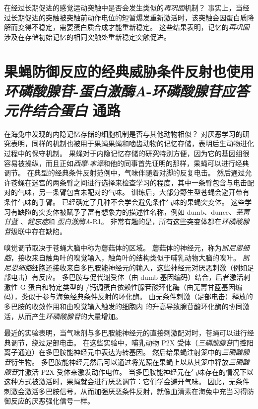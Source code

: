 在经过长期促进的感觉运动突触中是否会发生类似的\textit{再巩固}机制？
事实上，当经过长期促进的突触被突触前动作电位的短暂爆发重新激活时，该突触会因蛋白质降解而变得不稳定，需要蛋白质合成才能重新稳定。
这些结果表明，记忆的\textit{再巩固}涉及在存储初始记忆的相同突触处重新稳定突触促进。



\section{果蝇防御反应的经典威胁条件反射也使用\textit{环磷酸腺苷}-\textit{蛋白激酶A}-\textit{环磷酸腺苷应答元件结合蛋白} 通路}

在海兔中发现的内隐记忆存储的细胞机制是否与其他动物相似？
对厌恶学习的研究表明，同样的机制也被用于果蝇果蝇和啮齿动物的记忆存储，表明后生动物进化过程中的保守机制。
果蝇对于内隐记忆存储的研究特别方便，因为它的基因组很容易被操纵，而且正如\textit{西摩$\cdot$本泽}和他的同事首先证明的那样，果蝇可以进行经典调节。
在典型的经典条件反射范例中，气味伴随着对脚的反复电击。
然后通过允许苍蝇在迷宫的两条臂之间进行选择来检查学习的程度，其中一条臂包含与电击配对的气味，另一条臂包含未配对的气味。
训练后，大部分野生型苍蝇会避开带有条件气味的手臂。
已经确定了几种不会学会避免条件气味的果蝇突变体。
这些学习有缺陷的突变体被赋予了富有想象力的描述性名称，例如 dumb、dunce、\textit{芜菁甘蓝
}、\textit{健忘症}和 \textit{蛋白激酶A}-R1。
非常有趣的是，所有这些突变体都在\textit{环磷酸腺苷}级联中存在缺陷。


嗅觉调节取决于苍蝇大脑中称为蘑菇体的区域。
蘑菇体的神经元，称为\textit{凯尼恩细胞}，接收来自触角叶的嗅觉输入，触角叶的结构类似于哺乳动物大脑的嗅叶。
\textit{凯尼恩细胞}细胞还接收来自多巴胺能神经元的输入，这些神经元对厌恶刺激（例如足部电击）有反应。
多巴胺与促代谢受体（由 dumb 基因编码）结合，后者激活刺激性 G 蛋白和特定类型的 /钙调蛋白依赖性腺苷酸环化酶（由芜菁甘蓝基因编码），类似于参与海兔经典条件反射的环化酶。
由无条件刺激（足部电击）释放的多巴胺的收敛作用和由嗅觉输入触发的细胞内  的升高导致腺苷酸环化酶的协同激活，从而产生\textit{环磷酸腺苷}的大量增加。


最近的实验表明，当气味剂与多巴胺能神经元的直接刺激配对时，苍蝇可以进行经典调节，绕过足部电击。
在这些实验中，哺乳动物 P2X 受体（\textit{三磷酸腺苷}门控阳离子通道）在多巴胺能神经元中表达为转基因。
然后给果蝇注射笼中的\textit{三磷酸腺苷}衍生物。
多巴胺能神经元然后可以通过将光照在果蝇上以从其笼中释放\textit{三磷酸腺苷}并激活 P2X 受体来激发动作电位。
当多巴胺能神经元在气味存在的情况下以这种方式被激活时，果蝇就会进行厌恶调节：它们学会避开气味。
因此，无条件刺激会激活多巴胺信号，从而加强厌恶条件反射，就像血清素在海兔中充当习得防御反应的厌恶强化信号一样。


